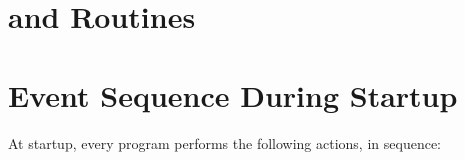 \section{ and  Routines}


\section{Event Sequence During \charmpp{} Startup}


At startup, every \charmpp{} program performs the following actions, in sequence:
